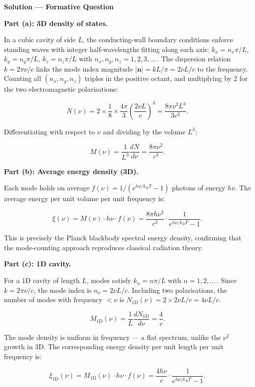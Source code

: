\textbf{\large Solution --- Formative Question}

\textbf{Part (a): 3D density of states.}

In a cubic cavity of side $L$, the conducting-wall boundary conditions enforce standing waves with integer half-wavelengths fitting along each axis: $k_x = n_x\pi/L$, $k_y = n_y\pi/L$, $k_z = n_z\pi/L$ with $n_x,n_y,n_z = 1,2,3,\ldots$\,. The dispersion relation $k = 2\pi\nu/c$ links the mode index magnitude $|\mathbf{n}| = kL/\pi = 2\nu L/c$ to the frequency. Counting all $(n_x,n_y,n_z)$ triples in the positive octant, and multiplying by 2 for the two electromagnetic polarisations:

\begin{equation*}
  N(\nu) = 2\times\frac{1}{8}\times\frac{4\pi}{3}\left(\frac{2\nu L}{c}\right)^{\!3}
  = \frac{8\pi\nu^{3}L^{3}}{3c^{3}}.
\end{equation*}

Differentiating with respect to $\nu$ and dividing by the volume $L^3$:

\begin{equation*}
  \boxed{M(\nu) = \frac{1}{L^3}\frac{dN}{d\nu} = \frac{8\pi\nu^{2}}{c^{3}}.}
\end{equation*}

\textbf{Part (b): Average energy density (3D).}

Each mode holds on average $f(\nu) = 1/(e^{h\nu/k_BT}-1)$ photons of energy $h\nu$. The average energy per unit volume per unit frequency is:

\begin{equation*}
  \boxed{\xi(\nu) = M(\nu)\cdot h\nu\cdot f(\nu) = \frac{8\pi h\nu^{3}}{c^{3}}\cdot\frac{1}{e^{h\nu/k_BT}-1}.}
\end{equation*}

This is precisely the Planck blackbody spectral energy density, confirming that the mode-counting approach reproduces classical radiation theory.

\textbf{Part (c): 1D cavity.}

For a 1D cavity of length $L$, modes satisfy $k_n = n\pi/L$ with $n = 1,2,\ldots$\,. Since $k = 2\pi\nu/c$, the mode index is $n_\nu = 2\nu L/c$. Including two polarisations, the number of modes with frequency $<\nu$ is $N_{1\mathrm{D}}(\nu) = 2\times 2\nu L/c = 4\nu L/c$.

\begin{equation*}
  \boxed{M_{1\mathrm{D}}(\nu) = \frac{1}{L}\frac{dN_{1\mathrm{D}}}{d\nu} = \frac{4}{c}.}
\end{equation*}

The mode density is uniform in frequency --- a flat spectrum, unlike the $\nu^2$ growth in 3D. The corresponding energy density per unit length per unit frequency is:

\begin{equation*}
  \xi_{1\mathrm{D}}(\nu) = M_{1\mathrm{D}}(\nu)\cdot h\nu\cdot f(\nu)
  = \frac{4h\nu}{c}\cdot\frac{1}{e^{h\nu/k_BT}-1}.
\end{equation*}

